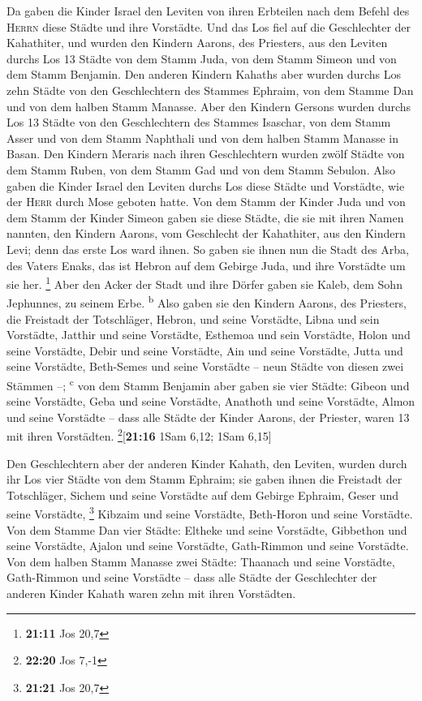  Da gaben die Kinder Israel den Leviten von ihren
Erbteilen nach dem Befehl des \textsc{Herrn} diese Städte und ihre
Vorstädte.  Und das Los fiel auf die Geschlechter der
Kahathiter, und wurden den Kindern Aarons, des Priesters, aus den
Leviten durchs Los 13 Städte von dem Stamm Juda, von dem Stamm Simeon
und von dem Stamm Benjamin.  Den anderen Kindern Kahaths
aber wurden durchs Los zehn Städte von den Geschlechtern des Stammes
Ephraim, von dem Stamme Dan und von dem halben Stamm Manasse.
 Aber den Kindern Gersons wurden durchs Los 13 Städte von
den Geschlechtern des Stammes Isaschar, von dem Stamm Asser und von dem
Stamm Naphthali und von dem halben Stamm Manasse in Basan.
 Den Kindern Meraris nach ihren Geschlechtern wurden zwölf
Städte von dem Stamm Ruben, von dem Stamm Gad und von dem Stamm Sebulon.
 Also gaben die Kinder Israel den Leviten durchs Los diese
Städte und Vorstädte, wie der \textsc{Herr} durch Mose geboten hatte.
 Von dem Stamm der Kinder Juda und von dem Stamm der
Kinder Simeon gaben sie diese Städte, die sie mit ihren Namen nannten,
 den Kindern Aarons, vom Geschlecht der Kahathiter, aus
den Kindern Levi; denn das erste Los ward ihnen.  So
gaben sie ihnen nun die Stadt des Arba, des Vaters Enaks, das ist Hebron
auf dem Gebirge Juda, und ihre Vorstädte um sie her. \footnote{\textbf{21:11}
  Jos 20,7}  Aber den Acker der Stadt und ihre Dörfer
gaben sie Kaleb, dem Sohn Jephunnes, zu seinem Erbe. \textsuperscript{b}
 Also gaben sie den Kindern Aarons, des Priesters, die
Freistadt der Totschläger, Hebron, und seine Vorstädte, Libna und sein
Vorstädte,  Jatthir und seine Vorstädte, Esthemoa und
sein Vorstädte,  Holon und seine Vorstädte, Debir und
seine Vorstädte,  Ain und seine Vorstädte, Jutta und
seine Vorstädte, Beth-Semes und seine Vorstädte -- neun Städte von
diesen zwei Stämmen --; \textsuperscript{c}  von dem
Stamm Benjamin aber gaben sie vier Städte: Gibeon und seine Vorstädte,
Geba und seine Vorstädte,  Anathoth und seine Vorstädte,
Almon und seine Vorstädte --  dass alle Städte der Kinder
Aarons, der Priester, waren 13 mit ihren Vorstädten.
\footnote{\textbf{22:20} Jos 7,-1}{[}\textbf{21:16} 1Sam 6,12; 1Sam
6,15{]}

 Den Geschlechtern aber der anderen Kinder Kahath, den
Leviten, wurden durch ihr Los vier Städte von dem Stamm Ephraim;
 sie gaben ihnen die Freistadt der Totschläger, Sichem
und seine Vorstädte auf dem Gebirge Ephraim, Geser und seine Vorstädte,
\footnote{\textbf{21:21} Jos 20,7}  Kibzaim und seine
Vorstädte, Beth-Horon und seine Vorstädte.  Von dem
Stamme Dan vier Städte: Eltheke und seine Vorstädte, Gibbethon und seine
Vorstädte,  Ajalon und seine Vorstädte, Gath-Rimmon und
seine Vorstädte.  Von dem halben Stamm Manasse zwei
Städte: Thaanach und seine Vorstädte, Gath-Rimmon und seine Vorstädte --
 dass alle Städte der Geschlechter der anderen Kinder
Kahath waren zehn mit ihren Vorstädten.

